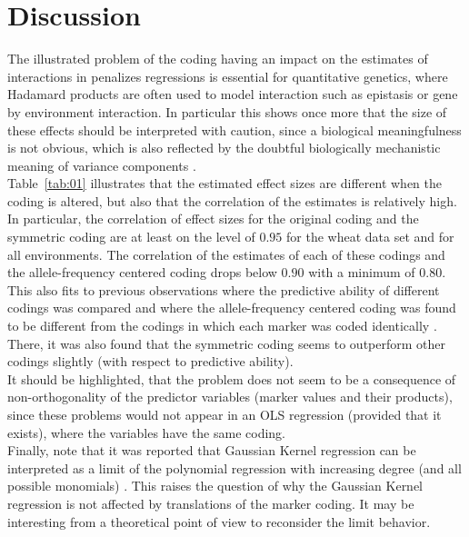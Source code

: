 \documentclass{bmcart}
\newcommand{\0}{\mathbf{0}}
\begin{document}
\section*{Discussion}
The illustrated problem of the coding having an impact on the estimates of interactions in penalizes regressions is essential for quantitative genetics, where Hadamard products are often used to model interaction such as epistasis or gene by environment interaction. In particular this shows once more that the size of these effects should be interpreted with caution, since a biological meaningfulness is not obvious, which is also reflected by the doubtful biologically mechanistic meaning of variance components \cite{Huang16}.\\

Table~\ref{tab:01} illustrates that the estimated effect sizes are different when the coding is altered, but also that the correlation of the estimates is relatively high.
In particular, the correlation of effect sizes for the original coding and the symmetric coding are at least on the level of $0.95$ for the wheat data set and for all environments. 
The correlation of the estimates of each of these codings and the allele-frequency centered coding drops below $0.90$ with a minimum of $0.80$. This also fits to previous observations where the predictive ability of different codings was compared and where the allele-frequency centered coding was found to be different from the codings in which each marker was coded identically \cite{Martini17}. 
There, it was also found that the symmetric coding seems to outperform other codings slightly (with respect to predictive ability). \\

It should be highlighted, that the problem does not seem to be a consequence of non-orthogonality of the predictor variables (marker values and their products), since these problems would not appear in an OLS regression (provided that it exists), where the variables have the same coding. \\

Finally, note that it was reported that Gaussian Kernel regression \cite{Morota14} can be interpreted as a limit of the polynomial regression with increasing degree (and all possible monomials) \cite{jiang15}. 
This raises the question of why the Gaussian Kernel regression is not affected by translations of the marker coding. It may be interesting from a theoretical point of view to reconsider the limit behavior.
\end{document}
